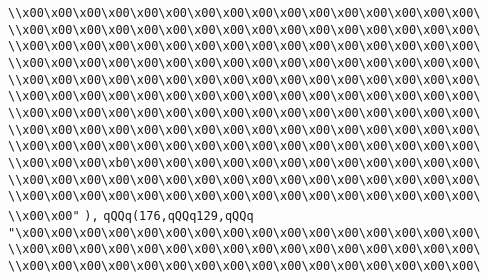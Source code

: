 \verb|\\x00\x00\x00\x00\x00\x00\x00\x00\x00\x00\x00\x00\x00\x00\x00\x00\|\newline
\verb|\\x00\x00\x00\x00\x00\x00\x00\x00\x00\x00\x00\x00\x00\x00\x00\x00\|\newline
\verb|\\x00\x00\x00\x00\x00\x00\x00\x00\x00\x00\x00\x00\x00\x00\x00\x00\|\newline
\verb|\\x00\x00\x00\x00\x00\x00\x00\x00\x00\x00\x00\x00\x00\x00\x00\x00\|\newline
\verb|\\x00\x00\x00\x00\x00\x00\x00\x00\x00\x00\x00\x00\x00\x00\x00\x00\|\newline
\verb|\\x00\x00\x00\x00\x00\x00\x00\x00\x00\x00\x00\x00\x00\x00\x00\x00\|\newline
\verb|\\x00\x00\x00\x00\x00\x00\x00\x00\x00\x00\x00\x00\x00\x00\x00\x00\|\newline
\verb|\\x00\x00\x00\x00\x00\x00\x00\x00\x00\x00\x00\x00\x00\x00\x00\x00\|\newline
\verb|\\x00\x00\x00\x00\x00\x00\x00\x00\x00\x00\x00\x00\x00\x00\x00\x00\|\newline
\verb|\\x00\x00\x00\xb0\x00\x00\x00\x00\x00\x00\x00\x00\x00\x00\x00\x00\|\newline
\verb|\\x00\x00\x00\x00\x00\x00\x00\x00\x00\x00\x00\x00\x00\x00\x00\x00\|\newline
\verb|\\x00\x00\x00\x00\x00\x00\x00\x00\x00\x00\x00\x00\x00\x00\x00\x00\|\newline
\verb|\\x00\x00"|\newline
\verb|),|\newline
\verb|qQQq(176,qQQq129,qQQq|\newline
\verb|"\x00\x00\x00\x00\x00\x00\x00\x00\x00\x00\x00\x00\x00\x00\x00\x00\|\newline
\verb|\\x00\x00\x00\x00\x00\x00\x00\x00\x00\x00\x00\x00\x00\x00\x00\x00\|\newline
\verb|\\x00\x00\x00\x00\x00\x00\x00\x00\x00\x00\x00\x00\x00\x00\x00\x00\|\newline
